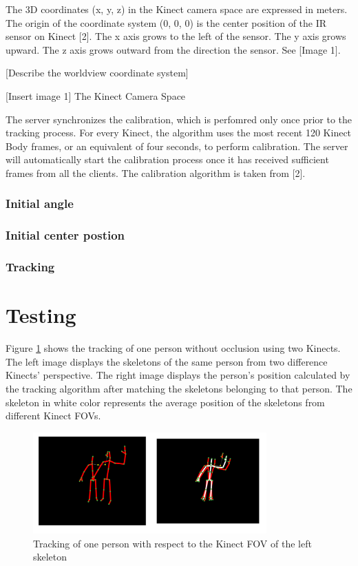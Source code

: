 \documentclass[paper=a4, fontsize=11pt]{scrartcl}
\numberwithin{equation}{section}		%
\numberwithin{figure}{section}			%
\numberwithin{table}{section}				%
\begin{document}
The 3D coordinates (x, y, z) in the Kinect camera space are expressed in meters. The origin of the coordinate system (0, 0, 0) is the center position of the IR sensor on Kinect [2]. The x axis grows to the left of the sensor. The y axis grows upward. The z axis grows outward from the direction the sensor. See [Image 1].

[Describe the worldview coordinate system]

[Insert image 1]
The Kinect Camera Space

The server synchronizes the calibration, which is perfomred only once prior to the tracking process. For every Kinect, the algorithm uses the most recent 120 Kinect Body frames, or an equivalent of four seconds, to perform calibration. The server will automatically start the calibration process once it has received sufficient frames from all the clients. The calibration algorithm is taken from [2].

\subsubsection{Initial angle}

\subsubsection{Initial center postion}

\subsubsection{Tracking}

\section{Testing}

Figure \ref{fig:fov1_all} shows the tracking of one person without occlusion using two Kinects. The left image displays the skeletons of the same person from two difference Kinects' perspective. The right image displays the person's position calculated by the tracking algorithm after matching the skeletons belonging to that person. The skeleton in white color represents the average position of the skeletons from different Kinect FOVs. 

\begin{figure}
	\centering
	\includegraphics[width=0.8\textwidth]{fov1_all}
	\caption{Tracking of one person with respect to the Kinect FOV of the left skeleton}
	\label{fig:fov1_all}
\end{figure}
\end{document}
